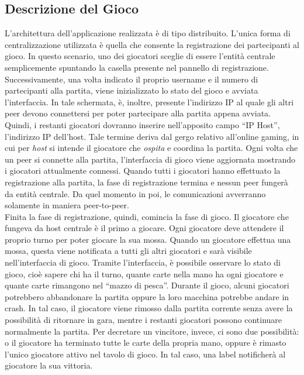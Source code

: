 \documentclass[11pt]{article} %
\begin{document}
\subsection{Descrizione del Gioco}
L'architettura dell'applicazione realizzata è di tipo distribuito. L'unica forma di centralizzazione utilizzata è quella che consente la registrazione dei 
partecipanti al gioco. In questo scenario, uno dei giocatori sceglie di essere l'entità centrale semplicemente spuntando la casella presente nel pannello 
di registrazione. Successivamente, una volta indicato il proprio username e il numero di partecipanti alla partita, viene inizializzato lo stato del gioco e
avviata l'interfaccia. In tale schermata, è, inoltre, presente l'indirizzo IP al quale gli altri peer devono connettersi per poter partecipare alla 
partita appena avviata. Quindi, i restanti giocatori dovranno inserire nell'apposito campo ``IP Host'', l'indirizzo IP dell'host. Tale termine deriva dal gergo relativo all'online gaming, in cui per \textit{host} si intende il giocatore che \textit{ospita} e coordina la partita. Ogni volta che un peer si
connette alla partita, l'interfaccia di gioco viene aggiornata mostrando i giocatori attualmente connessi. Quando tutti i giocatori hanno effettuato la 
registrazione alla partita, la fase di registrazione termina e nessun peer fungerà da entità centrale. Da quel momento in poi, le comunicazioni avverranno 
solamente in maniera peer-to-peer.\\
Finita la fase di registrazione, quindi, comincia la fase di gioco. Il giocatore che fungeva da host centrale è il primo a giocare. Ogni giocatore deve 
attendere il proprio turno per poter giocare la sua mossa. Quando un giocatore effettua una mossa, questa viene notificata a tutti gli altri giocatori e 
sarà visibile nell'interfaccia di gioco. Tramite l'interfaccia, è possibile osservare lo stato di gioco, cioè sapere chi ha il turno, quante carte nella 
mano ha ogni giocatore e quante carte rimangono nel ``mazzo di pesca''. Durante il gioco, alcuni giocatori potrebbero abbandonare la partita oppure
la loro macchina potrebbe andare in crash. In tal caso, il giocatore viene rimosso dalla partita corrente senza avere la possibilità di ritornare in gara, 
mentre i restanti giocatori possono continuare normalmente la partita. Per decretare un vincitore, invece, ci sono due possibilità: 
o il giocatore ha terminato tutte le carte della propria mano, oppure è rimasto l'unico giocatore attivo nel tavolo di gioco. 
In tal caso, una label notificherà al giocatore la sua vittoria.
\end{document}
